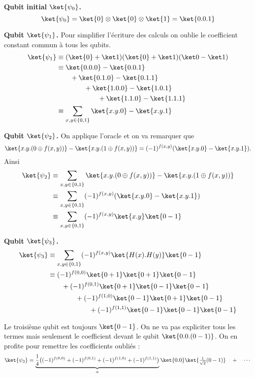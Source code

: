 \documentclass[11pt,class=report,crop=false]{standalone}
\begin{document}
\bigskip
\bigskip

\textbf{Qubit initial $\ket{\psi_0}$.}
$$\ket{\psi_0} = \ket{0} \otimes \ket{0} \otimes \ket{1} = \ket{0.0.1}$$

\textbf{Qubit $\ket{\psi_1}$.}
Pour simplifier l'écriture des calculs on \og{}oublie\fg{} le coefficient constant commun à tous les qubits.
\begin{align*}
\ket{\psi_1} 
  &\equiv (\ket{0}+\ket1)(\ket{0}+\ket1)(\ket0-\ket1) \\
  &\equiv \ket{0.0.0} - \ket{0.0.1} \\
  &\qquad +\ket{0.1.0} - \ket{0.1.1} \\
  &\qquad\qquad +\ket{1.0.0} - \ket{1.0.1} \\
  &\qquad\qquad\qquad +\ket{1.1.0} - \ket{1.1.1} \\
  &\equiv \sum_{x,y\in\{0,1\}} \ket{x.y.0} - \ket{x.y.1} \\
\end{align*}


\textbf{Qubit $\ket{\psi_2}$.}
On applique l'oracle et on va remarquer que 
$$\ket{x.y.(0 \oplus f(x,y))} - \ket{x.y.(1 \oplus f(x,y))}
= (-1)^{f(x,y)} (\ket{x.y.0} - \ket{x.y.1}).$$
Ainsi 
\begin{align*}
\ket{\psi_2} 
&\equiv \sum_{x,y\in\{0,1\}} \ket{x.y.(0 \oplus f(x,y))} - \ket{x.y.(1 \oplus f(x,y))}\\
&\equiv \sum_{x,y\in\{0,1\}} (-1)^{f(x,y)}(\ket{x.y.0} - \ket{x.y.1}) \\
&\equiv \sum_{x,y\in\{0,1\}} (-1)^{f(x,y)} \ket{x.y} \ket{0-1} \\
\end{align*}


\textbf{Qubit $\ket{\psi_3}$.}
\begin{align*}
\ket{\psi_3} 
&\equiv \sum_{x,y\in\{0,1\}} (-1)^{f(x,y)} \ket{H(x).H(y)} \ket{0-1} \\
  &\equiv (-1)^{f(0,0)} \ket{0+1} \ket{0+1} \ket{0-1} \\
  &\qquad + (-1)^{f(0,1)} \ket{0+1} \ket{0-1} \ket{0-1} \\ 
  &\qquad\qquad + (-1)^{f(1,0)} \ket{0-1} \ket{0+1} \ket{0-1} \\ 
  &\qquad\qquad\qquad  + (-1)^{f(1,1)} \ket{0-1} \ket{0-1} \ket{0-1} \\ 
\end{align*}

Le troisième qubit est toujours $\ket{0-1}$. On ne va pas expliciter tous les termes
mais seulement le coefficient devant le qubit $\ket{0.0.(0-1)}$.
On en profite pour remettre les coefficients oubliés :
$$\ket{\psi_3} = \underbrace{\frac14\big(
(-1)^{f(0,0)} + (-1)^{f(0,1)} + (-1)^{f(1,0)} + (-1)^{f(1,1)}
\big)}_{\alpha} \ket{0.0}\ket{\tfrac1{\sqrt2}(0-1)} \quad + \quad \cdots$$
\end{document}
